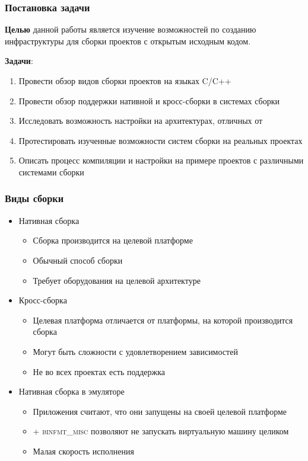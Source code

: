\documentclass[aspectratio=169]{beamer}
\begin{document}
\begin{frame}
	\frametitle{Постановка задачи}
	\textbf{Целью} данной работы является изучение возможностей по созданию
	инфраструктуры для сборки проектов с открытым исходным кодом.

	\textbf{Задачи}:
	\begin{enumerate}
		\item Провести обзор видов сборки проектов на языках \textsc{C}/\textsc{C++}
		\item Провести обзор поддержки нативной и кросс-сборки в системах сборки
		\item Исследовать возможность настройки \ci{} на архитектурах, отличных от \amd{}
		\item Протестировать изученные возможности систем сборки на реальных проектах
		\item Описать процесс компиляции и настройки \ci{} на примере проектов с различными системами сборки
	\end{enumerate}

\end{frame}

\begin{frame}
	\frametitle{Виды сборки}

	\begin{itemize}
		\item Нативная сборка
		      \begin{itemize}
			      \item Сборка производится на целевой платформе
			      \item Обычный способ сборки
			      \item Требует оборудования на целевой архитектуре
		      \end{itemize}
		\item Кросс-сборка
		      \begin{itemize}
			      \item Целевая платформа отличается от платформы, на которой производится сборка
			      \item Могут быть сложности с удовлетворением зависимостей
			      \item Не во всех проектах есть поддержка
		      \end{itemize}
		\item Нативная сборка в эмуляторе
		      \begin{itemize}
			      \item Приложения считают, что они запущены на своей целевой платформе
			      \item \qemu{} + \textsc{binfmt\_misc} позволяют не запускать виртуальную машину целиком
			      \item Малая скорость исполнения
		      \end{itemize}
	\end{itemize}
\end{frame}
\end{document}
